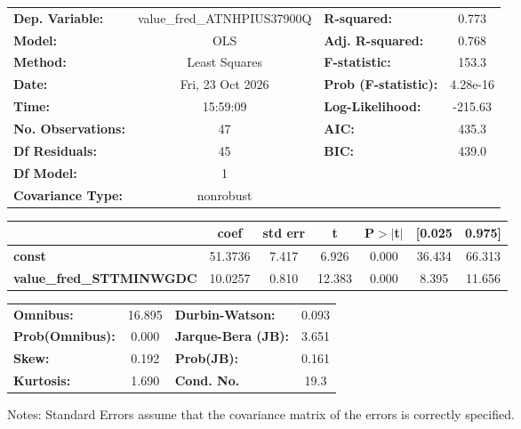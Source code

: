 \begin{center}
\begin{tabular}{lclc}
\toprule
\textbf{Dep. Variable:}          & value\_fred\_ATNHPIUS37900Q & \textbf{  R-squared:         } &     0.773   \\
\textbf{Model:}                  &             OLS             & \textbf{  Adj. R-squared:    } &     0.768   \\
\textbf{Method:}                 &        Least Squares        & \textbf{  F-statistic:       } &     153.3   \\
\textbf{Date:}                   &       Fri, 23 Oct 2026      & \textbf{  Prob (F-statistic):} &  4.28e-16   \\
\textbf{Time:}                   &           15:59:09          & \textbf{  Log-Likelihood:    } &   -215.63   \\
\textbf{No. Observations:}       &                47           & \textbf{  AIC:               } &     435.3   \\
\textbf{Df Residuals:}           &                45           & \textbf{  BIC:               } &     439.0   \\
\textbf{Df Model:}               &                 1           & \textbf{                     } &             \\
\textbf{Covariance Type:}        &          nonrobust          & \textbf{                     } &             \\
\bottomrule
\end{tabular}
\begin{tabular}{lcccccc}
                                 & \textbf{coef} & \textbf{std err} & \textbf{t} & \textbf{P$> |$t$|$} & \textbf{[0.025} & \textbf{0.975]}  \\
\midrule
\textbf{const}                   &      51.3736  &        7.417     &     6.926  &         0.000        &       36.434    &       66.313     \\
\textbf{value\_fred\_STTMINWGDC} &      10.0257  &        0.810     &    12.383  &         0.000        &        8.395    &       11.656     \\
\bottomrule
\end{tabular}
\begin{tabular}{lclc}
\textbf{Omnibus:}       & 16.895 & \textbf{  Durbin-Watson:     } &    0.093  \\
\textbf{Prob(Omnibus):} &  0.000 & \textbf{  Jarque-Bera (JB):  } &    3.651  \\
\textbf{Skew:}          &  0.192 & \textbf{  Prob(JB):          } &    0.161  \\
\textbf{Kurtosis:}      &  1.690 & \textbf{  Cond. No.          } &     19.3  \\
\bottomrule
\end{tabular}
\end{center}

Notes: \newline
 [1] Standard Errors assume that the covariance matrix of the errors is correctly specified.